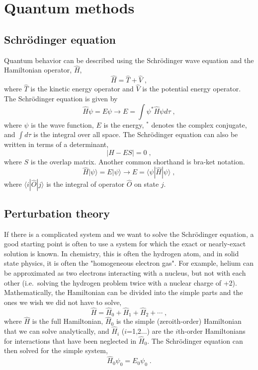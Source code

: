 \documentclass[12pt]{report}
\begin{document}
\section{Quantum methods}

\subsection{Schr\"{o}dinger equation}

Quantum behavior can be described using the Schr\"{o}dinger wave equation and
the Hamiltonian operator, $\hat H$,
\begin{equation}
 \hat H = \hat T + \hat V \; ,
\end{equation}
where $\hat T$ is the kinetic energy operator and $\hat V$ is the potential
energy operator.
The Schr\"{o}dinger equation is given by
\begin{equation}
 \hat H\psi = E\psi \to E = \int \psi^*\hat H\psi d\tau \; ,
\end{equation}
where $\psi$ is the wave function, $E$ is the energy, $^*$ denotes the complex
conjugate, and $\int d\tau$ is the integral over all space.
The Schr\"{o}dinger equation can also be written in terms of a determinant,
\begin{equation}
 |H-ES| = 0 \; ,
\end{equation}
where $S$ is the overlap matrix.
Another common shorthand is bra-ket notation.
\begin{equation}
 \hat H|\psi\rangle = E|\psi\rangle \to E=\langle\psi|\hat H|\psi\rangle \; ,
\end{equation}
where $\langle i|\hat O|j\rangle$ is the integral of operator $\hat O$ on
state $j$.

\subsection{Perturbation theory}

If there is a complicated system and we want to solve the Schr\"{o}dinger
equation, a good starting point is often to use a system for which the exact
or nearly-exact solution is known.
In chemistry, this is often the hydrogen atom, and in solid state physics, it
is often the "homogeneous electron gas".
For example, helium can be approximated as two electrons interacting with a
nucleus, but not with each other (i.e.\ solving the hydrogen problem twice
with a nuclear charge of +2). \\

Mathematically, the Hamiltonian can be divided into the simple parts and the
ones we wish we did not have to solve,
\begin{equation}
 \hat H = \hat H_0+\hat H_1+\hat H_2+\cdots \; ,
\end{equation}
where $\hat H$ is the full Hamiltonian, $\hat H_0$ is the simple
(zeroith-order) Hamiltonian that we can solve analytically, and $\hat H_i$
($i$=1,2...) are the $i$th-order Hamiltonians for interactions that have been
neglected in $\hat H_0$.
The Schr\"{o}dinger equation can then solved for the simple system,
\begin{equation}
 \hat H_0\psi_0=E_0\psi_0 \; .
\end{equation}
\end{document}
